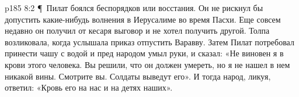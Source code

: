 \vs p185 8:2 \P\ Пилат боялся беспорядков или восстания. Он не рискнул бы допустить какие\hyp{}нибудь волнения в Иерусалиме во время Пасхи. Еще совсем недавно он получил от кесаря выговор и не хотел получить другой. Толпа возликовала, когда услышала приказ отпустить Варавву. Затем Пилат потребовал принести чашу с водой и пред народом умыл руки, и сказал: «Не виновен я в крови этого человека. Вы решили, что он должен умереть, но я не нашел в нем никакой вины. Смотрите вы. Солдаты выведут его». И тогда народ, ликуя, ответил: «Кровь его на нас и на детях наших».
